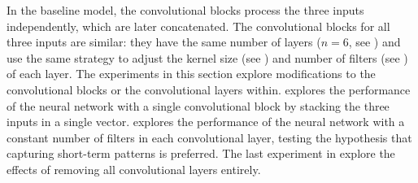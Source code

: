 
In the baseline model, the convolutional blocks process the
three inputs independently, which are later concatenated.
The convolutional blocks for all three inputs are similar:
they have the same number of layers ($n=6$, see
) and use the
same strategy to adjust the kernel size (see
) and number of filters (see
) of each layer. The
experiments in this section explore modifications to the
convolutional blocks or the convolutional layers within.
 explores the
performance of the neural network with a single
convolutional block by stacking the three inputs in a single
vector.  explores the
performance of the neural network with a constant number of
filters in each convolutional layer, testing the hypothesis
that capturing short-term patterns is preferred. The last
experiment in  explore
the effects of removing all convolutional layers entirely.
